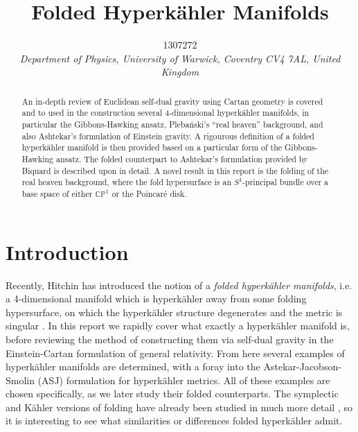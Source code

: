 \documentclass[a4paper,12pt, onecolumn, notitlepage]{article}
\theoremstyle{definition}
\theoremstyle{remark}
\newcommand{\K}{K\"ahler }
\newcommand{\HK}{hyperk\"ahler }
\begin{document}
\title{\textbf{\large{Folded Hyperk\"ahler Manifolds}}}
	
\author{\normalsize{1307272} \\
	\small\textit{
		Department of Physics, University of Warwick,
		Coventry CV4 7AL, United Kingdom}}
\date{}
\maketitle 
\vspace{-10mm}
\begin{abstract} 
\noindent
An in-depth review of Euclidean self-dual gravity using Cartan geometry is covered and to used in the construction several 4-dimensional \HK manifolds, in particular the Gibbons-Hawking ansatz, Pleba\'nski's ``real heaven'' background, and also Ashtekar's formulation of Einstein gravity.
A rigourous definition of a folded \HK manifold is then provided based on a particular form of the Gibbons-Hawking ansatz. The folded counterpart to Ashtekar's formulation provided by Biquard is described upon in detail. A novel result in this report is the folding of the real heaven background, where the fold hypersurface is an $S^{1}$-principal bundle over a base space of either $\mathbb{CP}^{1}$ or the Poincar\'e disk.
\end{abstract}
\vspace{11mm}	
	
\section{Introduction}
Recently, Hitchin has introduced the notion of a \emph{folded hyperk{\"a}hler manifolds}, i.e. a 4-dimensional manifold which is hyperk{\"a}hler away from some folding hypersurface, on which the hyperk{\"a}hler structure degenerates and the metric is singular \cite{hitchin_2015,biquard_2015}. In this report we rapidly cover what exactly a \HK manifold is, before reviewing the method of constructing them via self-dual gravity in the Einstein-Cartan formulation of general relativity. From here several examples of \HK manifolds are determined, with a foray into the Astekar-Jacobson-Smolin (ASJ) formulation for \HK metrics. All of these examples are chosen specifically, as we later study their folded counterparts. The symplectic and \K versions of folding have already been studied in much more detail \cite{dasilva_2000,baykur_2006}, so it is interesting to see what similarities or differences folded \HK admit.\\
\end{document}
